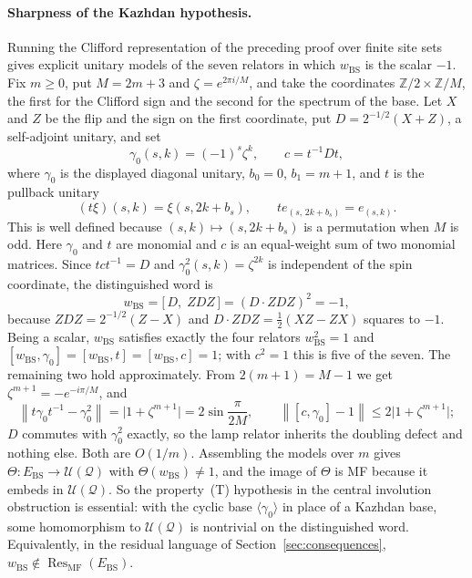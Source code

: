 \documentclass[11pt]{amsart}
\newcommand{\leanverified}[2]{\ignorespaces}
\theoremstyle{definition}
\theoremstyle{remark}
\theoremstyle{plain}
\newcommand{\U}{\mathcal U}
\newcommand{\opnorm}[1]{\left\lVert #1\right\rVert}
\begin{document}
\paragraph{Sharpness of the Kazhdan hypothesis.}
Running the Clifford representation of the preceding proof over
finite site sets gives explicit unitary models of the seven relators
in which $w_{\mathrm{BS}}$ is the scalar $-1$.  Fix $m\ge0$, put
$M=2m+3$ and $\zeta=e^{2\pi i/M}$, and take the coordinates
$\mathbb Z/2\times\mathbb Z/M$, the first for the Clifford sign and
the second for the spectrum of the base.  Let $X$ and $Z$ be the flip and
the sign on the first coordinate, put $D=2^{-1/2}(X+Z)$, a
self-adjoint unitary, and set
\[
 \gamma_0(s,k)=(-1)^{s}\zeta^{k},\qquad c=t^{-1}Dt,
\]
where $\gamma_0$ is the displayed diagonal unitary, $b_0=0$,
$b_1=m+1$, and $t$ is the pullback unitary
\[
 (t\xi)(s,k)=\xi(s,2k+b_s),
 \qquad t e_{(s,\,2k+b_s)}=e_{(s,k)}.
\]
This is well defined because $(s,k)\mapsto(s,2k+b_s)$ is a permutation
when $M$ is odd.  Here $\gamma_0$ and $t$
are monomial and $c$ is an equal-weight sum of two monomial matrices.
Since $tct^{-1}=D$ and $\gamma_0^2(s,k)=\zeta^{2k}$ is independent of
the spin coordinate, the distinguished word is
\[
 w_{\mathrm{BS}}=\bigl[\,D,\;ZDZ\,\bigr]=(D\cdot ZDZ)^2=-1 ,
\]
because $ZDZ=2^{-1/2}(Z-X)$ and $D\cdot ZDZ=\tfrac12(XZ-ZX)$ squares
to $-1$.  Being a scalar, $w_{\mathrm{BS}}$ satisfies exactly the four
relators $w_{\mathrm{BS}}^2=1$ and
$[w_{\mathrm{BS}},\gamma_0]=[w_{\mathrm{BS}},t]=[w_{\mathrm{BS}},c]=1$;
with $c^2=1$ this is five of the seven.  The remaining two hold
approximately.  From $2(m+1)=M-1$ we get
$\zeta^{m+1}=-e^{-i\pi/M}$, and
\[
 \opnorm{t\gamma_0t^{-1}-\gamma_0^{2}}=\bigl|1+\zeta^{m+1}\bigr|
 =2\sin\frac{\pi}{2M},
 \qquad
 \opnorm{[c,\gamma_0]-1}\le2\bigl|1+\zeta^{m+1}\bigr| ;
\]
$D$ commutes with $\gamma_0^2$ exactly, so the lamp relator inherits
the doubling defect and nothing else.  Both are $O(1/m)$.  Assembling
the models over $m$ gives
$\Theta\colon E_{\mathrm{BS}}\to\U(\mathcal Q)$ with
$\Theta(w_{\mathrm{BS}})\ne1$, and the image of $\Theta$ is MF
because it embeds in $\U(\mathcal Q)$.  So the
property~\textup{(T)} hypothesis in the central involution
obstruction is essential: with the cyclic base
$\langle\gamma_0\rangle$ in place of a Kazhdan base, some
homomorphism to $\U(\mathcal Q)$ is nontrivial on the distinguished
word.  Equivalently, in
the residual language of Section~\ref{sec:consequences},
$w_{\mathrm{BS}}\notin\operatorname{Res}_{\mathrm{MF}}(E_{\mathrm{BS}})$.
\leanverified{Sofic/CliffordBSAmenableMF}{GroupApproximation.CliffordBSAmenableMF.manuscriptSharpnessOfKazhdanHypothesis}
\end{document}
